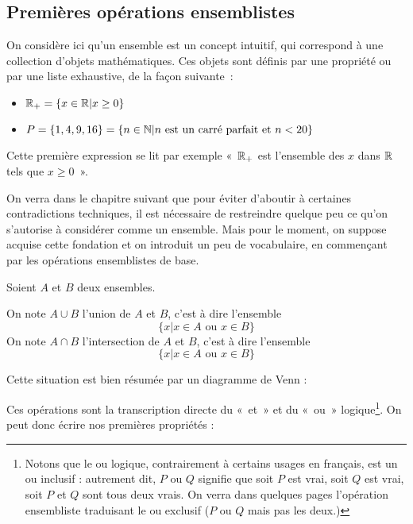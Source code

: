 \subsection*{Premières opérations ensemblistes}
On considère ici qu'un ensemble est un concept intuitif, qui correspond à une collection d'objets mathématiques. Ces objets sont définis par une propriété ou par une liste exhaustive, de la façon suivante~: 
\begin{itemize}
    \item $\mathbb{R}_+ = \{x\in \mathbb{R} |x\geq 0\}$
    \item $P = \{1,4,9,16\} = \{n \in \mathbb{N} | n \text{ est un carré parfait et } n<20\}$
\end{itemize}
Cette première expression se lit par exemple «~$\mathbb{R}_+$ est l'ensemble des $x$ dans $\mathbb{R}$ tels que $x\geq 0$~».

On verra dans le chapitre suivant que pour éviter d'aboutir à certaines contradictions techniques, il est nécessaire de restreindre quelque peu ce qu'on s'autorise à considérer comme un ensemble. Mais pour le moment, on suppose acquise cette fondation et on introduit un peu de vocabulaire, en commençant par les opérations ensemblistes de base.

\begin{defini}
    Soient $A$ et $B$ deux ensembles. 
    
    On note $A\cup B$ l'union de $A$ et $B$, c'est à dire l'ensemble \[\{x|x\in A \text{ ou } x\in B\}\] 
    On note $A\cap B$ l'intersection de $A$ et $B$, c'est à dire l'ensemble \[\{x|x\in A \text{ ou } x\in B\}\]
\end{defini}

Cette situation est bien résumée par un diagramme de Venn :

\medskip
{}

Ces opérations sont la transcription directe du «~et~» et du «~ou~» logique\footnote[1]{Notons que le ou logique, contrairement à certains usages en français, est un ou inclusif : autrement dit, $P$ ou $Q$ signifie que soit $P$ est vrai, soit $Q$ est vrai, soit $P$ et $Q$ sont tous deux vrais. On verra dans quelques pages l'opération ensembliste traduisant le ou exclusif ($P$ ou $Q$ mais pas les deux.)}. On peut donc écrire nos premières propriétés : 

